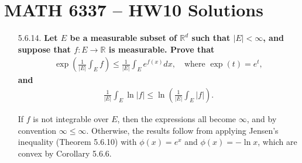 \documentclass[a4paper,12pt]{article}
\begin{document}
\section*{MATH 6337 -- HW10 Solutions}
\sloppy
\begin{enumerate}
    \item[5.6.14.]
        \boldmath\textbf{Let $E$ be a measurable subset of $\mathbb{R}^d$ such that $|E| < \infty$, and suppose that $f : E \to \mathbb{R}$ is measurable. Prove that
        \begin{align*}
            \exp\left( \frac{1}{|E|} \int_E f \right) \leq \frac{1}{|E|} \int_E e^{f(x)} dx, \quad \text{where }\exp(t) = e^t,
        \end{align*}
        and
        \begin{align*}
            \frac{1}{|E|} \int_E \ln|f| \leq \ln\left( \frac{1}{|E|} \int_E |f| \right).
        \end{align*}
        }\unboldmath \par
        If $f$ is not integrable over $E$, then the expressions all become $\infty$, and by convention $\infty \leq \infty$. Otherwise, the results follow from applying Jensen's inequality (Theorem 5.6.10) with $\phi(x) = e^x$ and $\phi(x) = -\ln x$, which are convex by Corollary 5.6.6. 


\end{enumerate}
\end{document}
